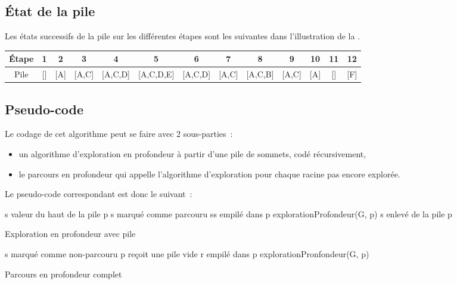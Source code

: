 \documentclass[11pt]{article}
\begin{document}
\subsection{État de la pile}

Les états successifs de la pile sur les différentes étapes sont les suivantes dans l'illustration de la .

\begin{center}
	\begin{tabular}{|c|c|c|c|c|c|c|c|c|c|c|c|c|}
		\hline
		Étape & 1 & 2 & 3 & 4 & 5 & 6 & 7 & 8 & 9 & 10 & 11 & 12 \\
		\hline
		Pile & [] & [A] & [A,C] & [A,C,D] & [A,C,D,E] & [A,C,D] & [A,C] & [A,C,B] & [A,C] & [A] & [] & [F] \\
		\hline
	\end{tabular}
\end{center}

\newpage

\subsection{Pseudo-code}

Le codage de cet algorithme peut se faire avec 2 sous-parties~: 
\begin{itemize}
	\item un algorithme d'exploration en profondeur à partir d'une pile de sommets, codé récursivement, 
	\item le parcours en profondeur qui appelle l'algorithme d'exploration pour chaque racine pas encore explorée.
\end{itemize}

Le pseudo-code correspondant est donc le suivant~:

\begin{algorithm}
	s valeur du haut de la pile p \;
	s marqué comme parcouru \;
	{
		{
			ss empilé dans p \;
			explorationProfondeur(G, p)
		}
	}
	s enlevé de la pile p \;
\caption{Exploration en profondeur avec pile}
\end{algorithm}

\begin{algorithm}
	{
		s marqué comme non-parcouru\;
	}
	{
		{
			p reçoit une pile vide \;
			r empilé dans p \;
			explorationPronfondeur(G, p) \;
		}
	}
	\caption{Parcours en profondeur complet}
\end{algorithm}
\end{document}
